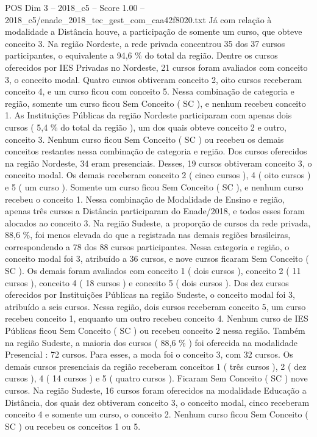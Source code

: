 \begin{textsample}{POS Dim 3 – 2018\_c5 – Score 1.00 – 2018\_c5/enade\_2018\_tec\_gest\_com\_caa42f8020.txt}
Já com relação à modalidade a Distância houve, a participação de somente um curso, que obteve conceito 3.
Na região Nordeste, a rede privada concentrou 35 dos 37 cursos participantes, o equivalente a 94,6 \% do total da região.
Dentre os cursos oferecidos por IES Privadas no Nordeste, 21 cursos foram avaliados com conceito 3, o conceito modal.
Quatro cursos obtiveram conceito 2, oito cursos receberam conceito 4, e um curso ficou com conceito 5.
Nessa combinação de categoria e região, somente um curso ficou Sem Conceito ( SC ), e nenhum recebeu conceito 1.
As Instituições Públicas da região Nordeste participaram com apenas dois cursos ( 5,4 \% do total da região ), um dos quais obteve conceito 2 e outro, conceito 3.
Nenhum curso ficou Sem Conceito ( SC ) ou recebeu os demais conceitos restantes nessa combinação de categoria e região.
Dos cursos oferecidos na região Nordeste, 34 eram presenciais.
Desses, 19 cursos obtiveram conceito 3, o conceito modal.
Os demais receberam conceito 2 ( cinco cursos ), 4 ( oito cursos ) e 5 ( um curso ).
Somente um curso ficou Sem Conceito ( SC ), e nenhum curso recebeu o conceito 1.
Nessa combinação de Modalidade de Ensino e região, apenas três cursos a Distância participaram do Enade/2018, e todos esses foram alocados ao conceito 3.
Na região Sudeste, a proporção de cursos da rede privada, 88,6 \%, foi menos elevada do que a registrada nas demais regiões brasileiras, correspondendo a 78 dos 88 cursos participantes.
Nessa categoria e região, o conceito modal foi 3, atribuído a 36 cursos, e nove cursos ficaram Sem Conceito ( SC ).
Os demais foram avaliados com conceito 1 ( dois cursos ), conceito 2 ( 11 cursos ), conceito 4 ( 18 cursos ) e conceito 5 ( dois cursos ).
Dos dez cursos oferecidos por Instituições Públicas na região Sudeste, o conceito modal foi 3, atribuído a seis cursos.
Nessa região, dois cursos receberam conceito 5, um curso recebeu conceito 1, enquanto um outro recebeu conceito 4.
Nenhum curso de IES Públicas ficou Sem Conceito ( SC ) ou recebeu conceito 2 nessa região.
Também na região Sudeste, a maioria dos cursos ( 88,6 \% ) foi oferecida na modalidade Presencial : 72 cursos.
Para esses, a moda foi o conceito 3, com 32 cursos.
Os demais cursos presenciais da região receberam conceitos 1 ( três cursos ), 2 ( dez cursos ), 4 ( 14 cursos ) e 5 ( quatro cursos ).
Ficaram Sem Conceito ( SC ) nove cursos.
Na região Sudeste, 16 cursos foram oferecidos na modalidade Educação a Distância, dos quais dez obtiveram conceito 3, o conceito modal, cinco receberam conceito 4 e somente um curso, o conceito 2.
Nenhum curso ficou Sem Conceito ( SC ) ou recebeu os conceitos 1 ou 5.

\end{textsample}
